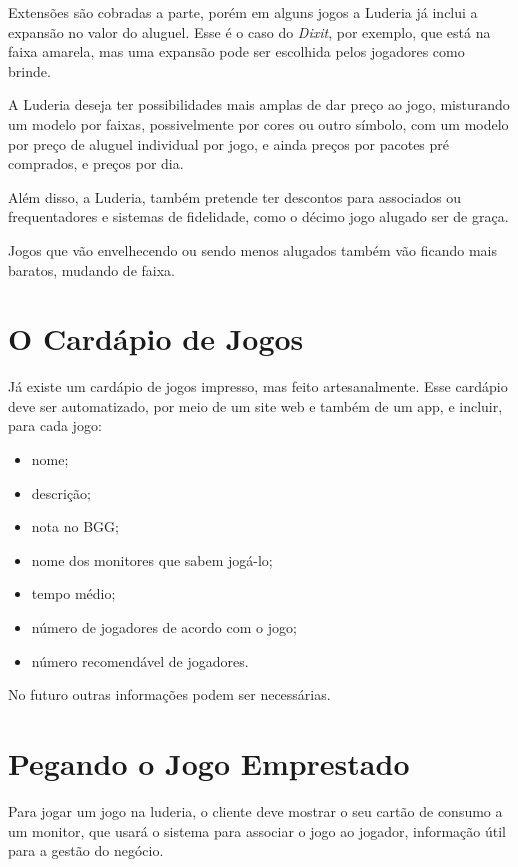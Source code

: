 Extensões são cobradas a parte, porém em alguns jogos a Luderia já inclui a expansão no valor do aluguel. Esse é o caso do \textit{Dixit}, por exemplo, que está na faixa amarela, mas uma expansão pode ser escolhida pelos jogadores como brinde.

A Luderia deseja ter possibilidades mais amplas de dar preço ao jogo, misturando um modelo por faixas, possivelmente por cores ou outro símbolo, com um modelo por preço de aluguel individual por jogo, e ainda preços por pacotes pré comprados, e preços por dia.

Além disso, a Luderia, também pretende ter descontos para associados ou frequentadores e sistemas de fidelidade, como o décimo jogo alugado ser de graça.

Jogos que vão envelhecendo ou sendo menos alugados também vão ficando mais baratos, mudando de faixa.

\section{O Cardápio de Jogos}

Já existe um cardápio de jogos impresso, mas feito artesanalmente. Esse cardápio deve ser automatizado, por meio de um site web e também de um app, e incluir, para cada jogo:
\begin{itemize}
    \item nome;
    \item descrição;
    \item nota no BGG;
    \item nome dos monitores que sabem jogá-lo;
    \item tempo médio;
    \item número de jogadores de acordo com o jogo;
    \item número recomendável de jogadores.
\end{itemize}

No futuro outras informações podem ser necessárias.

\section{Pegando o Jogo Emprestado}

Para jogar um jogo na luderia, o cliente deve mostrar o seu cartão de consumo a um monitor, que usará o sistema para associar o jogo ao jogador, informação útil para a gestão do negócio.


